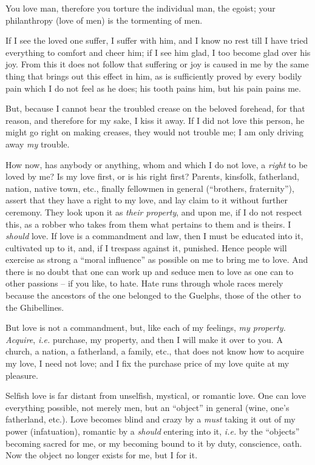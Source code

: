 You love man, therefore you torture the individual man, the egoist; your 
philanthropy (love of men) is the tormenting of men.

If I see the loved one suffer, I suffer with him, and I know no rest till I 
have tried everything to comfort and cheer him; if I see him glad, I too 
become glad over his joy. From this it does not follow that suffering or joy 
is caused in me by the same thing that brings out this effect in him, as is 
sufficiently proved by every bodily pain which I do not feel as he does; his 
tooth pains him, but his pain pains me.

But, because I cannot bear the troubled crease on the beloved forehead, for 
that reason, and therefore for my sake, I kiss it away. If I did not love this 
person, he might go right on making creases, they would not trouble me; I am 
only driving away \textit{my} trouble.

How now, has anybody or anything, whom and which I do not love, a 
\textit{right} to be loved by me? Is my love first, or is his right first? 
Parents, kinsfolk, fatherland, nation, native town, etc., finally fellowmen in 
general (``brothers, fraternity''), assert that they have a right to my 
love, and lay claim to it without further ceremony. They look upon it as 
\textit{their property}, and upon me, if I do not respect this, as a robber 
who takes from them what pertains to them and is theirs. I \textit{should} 
love. If love is a commandment and law, then I must be educated into it, 
cultivated up to it, and, if I trespass against it, punished. Hence people 
will exercise as strong a ``moral influence'' as possible on me to bring me 
to love. And there is no doubt that one can work up and seduce men to love as 
one can to other passions -- if you like, to hate. Hate runs through whole 
races merely because the ancestors of the one belonged to the Guelphs, those 
of the other to the Ghibellines.

But love is not a commandment, but, like each of my feelings, \textit{my 
property. Acquire}, \textit{i.e.} purchase, my property, and then I will make 
it over to you. A church, a nation, a fatherland, a family, etc., that does 
not know how to acquire my love, I need not love; and I fix the purchase price 
of my love quite at my pleasure.

Selfish love is far distant from unselfish, mystical, or romantic love. One 
can love everything possible, not merely men, but an ``object'' in general 
(wine, one's fatherland, etc.). Love becomes blind and crazy by a 
\textit{must} taking it out of my power (infatuation), romantic by a 
\textit{should} entering into it, \textit{i.e.} by the ``objects'' becoming 
sacred for me, or my becoming bound to it by duty, conscience, oath. Now the 
object no longer exists for me, but I for it.


